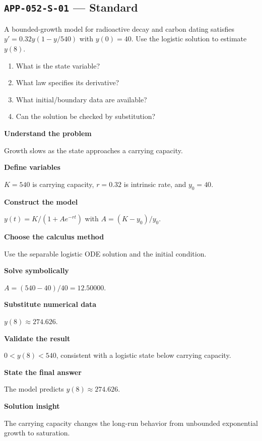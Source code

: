 \documentclass[11pt]{book}
\newcommand{\pid}[1]{\texttt{#1}}
\begin{document}
\subsection*{\pid{APP-052-S-01} — Standard}
\begin{problembox}
A bounded-growth model for radioactive decay and carbon dating satisfies $y'=0.32y(1-y/540)$ with $y(0)=40$. Use the logistic solution to estimate $y(8)$.
\end{problembox}
\begin{promptbox}\begin{enumerate}
\item What is the state variable?
\item What law specifies its derivative?
\item What initial/boundary data are available?
\item Can the solution be checked by substitution?
\end{enumerate}\end{promptbox}
\begin{solutionbox}
\textbf{Understand the problem}\par Growth slows as the state approaches a carrying capacity.\par\medskip
\textbf{Define variables}\par $K=540$ is carrying capacity, $r=0.32$ is intrinsic rate, and $y_0=40$.\par\medskip
\textbf{Construct the model}\par $y(t)=K/(1+A e^{-rt})$ with $A=(K-y_0)/y_0$.\par\medskip
\textbf{Choose the calculus method}\par Use the separable logistic ODE solution and the initial condition.\par\medskip
\textbf{Solve symbolically}\par $A=(540-40)/40=12.50000$.\par\medskip
\textbf{Substitute numerical data}\par $y(8)\approx 274.626$.\par\medskip
\textbf{Validate the result}\par $0<y(8)<540$, consistent with a logistic state below carrying capacity.\par\medskip
\textbf{State the final answer}\par The model predicts $y(8)\approx 274.626$.\par\medskip
\textbf{Solution insight}\par The carrying capacity changes the long-run behavior from unbounded exponential growth to saturation.\par\medskip
\end{solutionbox}
\end{document}
